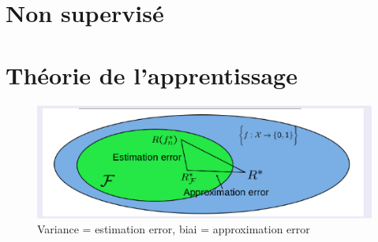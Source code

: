 \documentclass{article}
\theoremstyle{plain}%
\theoremstyle{definition}
\theoremstyle{remark}
\begin{document}
\section{Non supervisé}

\section{Théorie de l'apprentissage}
\begin{figure}[!htbp]
    \centering
    \includegraphics*[width=.65\textwidth]{biais-variance.png}
    \caption{Variance = estimation error, biai = approximation error}
    \label{<label>}
\end{figure}
\end{document}

